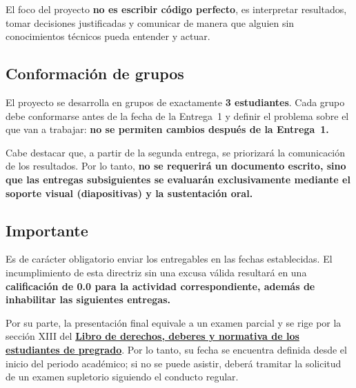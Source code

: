 \documentclass[11pt,letterpaper]{article}
\begin{document}

El foco del proyecto \textbf{no es escribir código perfecto}, es interpretar resultados, tomar decisiones justificadas y comunicar de manera que alguien sin conocimientos técnicos pueda entender y actuar.

\subsection{Conformación de grupos}

El proyecto se desarrolla en grupos de exactamente \textbf{3 estudiantes}. Cada grupo debe conformarse antes de la fecha de la Entrega~1 y definir el problema sobre el que van a trabajar: \textbf{no se permiten cambios después de la Entrega~1.}

Cabe destacar que, a partir de la segunda entrega, se priorizará la comunicación de los resultados. Por lo tanto, \textbf{no se requerirá un documento escrito, sino que las entregas subsiguientes se evaluarán exclusivamente mediante el soporte visual (diapositivas) y la sustentación oral.}


\subsection{Importante}

Es de carácter obligatorio enviar los entregables en las fechas establecidas. El incumplimiento de esta directriz sin una excusa válida resultará en una \textbf{calificación de 0.0 para la actividad correspondiente, además de inhabilitar las siguientes entregas.}

Por su parte, la presentación final equivale a un examen parcial y se rige por la sección XIII del \href{https://www.icesi.edu.co/wp-content/uploads/2024/08/Reglamento-estudiantes-pregrado-LDDN-marzo-2026.pdf}{ \textbf{Libro de derechos, deberes y normativa de los estudiantes de pregrado}}. Por lo tanto, su fecha se encuentra definida desde el inicio del periodo académico; si no se puede asistir, deberá tramitar la solicitud de un examen supletorio siguiendo el conducto regular.
\end{document}
